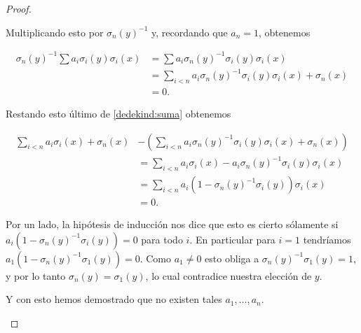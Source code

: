 \begin{proof}
\begin{itemize}
            Multiplicando esto por $\sigma_n(y)^{-1}$ y, recordando que $a_n = 1$, obtenemos

            \begin{align}
                    \sigma_n(y)^{-1} \sum a_i \sigma_i(y)\sigma_i(x)    &=  \sum a_i \sigma_n(y)^{-1}\sigma_i(y)\sigma_i(x)                         \\
                                                                        &=  \sum_{i < n} a_i \sigma_n(y)^{-1}\sigma_i(y)\sigma_i(x) +   \sigma_n(x) \\
                                                                        &=  0. 
            \end{align}
            
            Restando esto último de \eqref{dedekind:suma} obtenemos
            
            \begin{align}
                    \sum_{i < n} a_i \sigma_i(x) + \sigma_n(x)  &-  (\sum_{i < n} a_i \sigma_n(y)^{-1}\sigma_i(y)\sigma_i(x) + \sigma_n(x))     \\ 
                                                                &=  \sum_{i < n} a_i \sigma_i(x) - a_i \sigma_n(y)^{-1}\sigma_i(y)\sigma_i(x)   \\
                                                                &=  \sum_{i < n} a_i (1 - \sigma_n(y)^{-1}\sigma_i(y)) \sigma_i(x)              \\
                                                                &=  0.                                                                                                                       
            \end{align}                                   
            
            Por un lado, la hipótesis de inducción nos dice que esto es cierto sólamente si 
            $a_i (1 - \sigma_n(y)^{-1}\sigma_i(y)) = 0$ para todo
            $i$. En particular para $i = 1$ tendríamos $a_1 (1 - \sigma_n(y)^{-1}\sigma_1(y)) = 0$. 
            Como $a_1 \not= 0$ esto obliga a $\sigma_n(y)^{-1}\sigma_1(y) = 1$, y por lo tanto 
            $\sigma_n(y) = \sigma_1(y)$, lo cual contradice nuestra elección de $y$.\par\null
            
            Y con esto hemos demostrado que no existen tales $a_1, \dots, a_n$.
    \end{itemize}
\end{proof}

